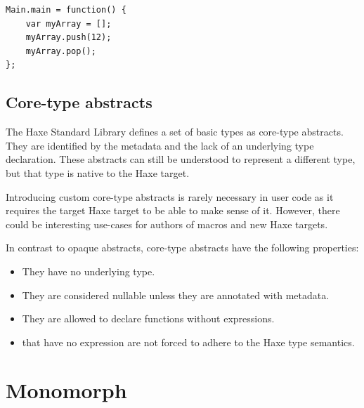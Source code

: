 \documentclass{haxe}
\begin{document}
\begin{lstlisting}
Main.main = function() {
	var myArray = [];
	myArray.push(12);
	myArray.pop();
};
\end{lstlisting}



\subsection{Core-type abstracts}
\label{types-abstract-core-type}

The Haxe Standard Library defines a set of basic types as core-type abstracts. They are identified by the  metadata and the lack of an underlying type declaration. These abstracts can still be understood to represent a different type, but that type is native to the Haxe target. 

Introducing custom core-type abstracts is rarely necessary in user code as it requires the target Haxe target to be able to make sense of it. However, there could be interesting use-cases for authors of macros and new Haxe targets.

In contrast to opaque abstracts, core-type abstracts have the following properties:

\begin{itemize}
	\item They have no underlying type.
	\item They are considered nullable unless they are annotated with  metadata.
	\item They are allowed to declare  functions without expressions.
	\item {} that have no expression are not forced to adhere to the Haxe type semantics.
\end{itemize}



\section{Monomorph}
\label{types-monomorph}
\end{document}
